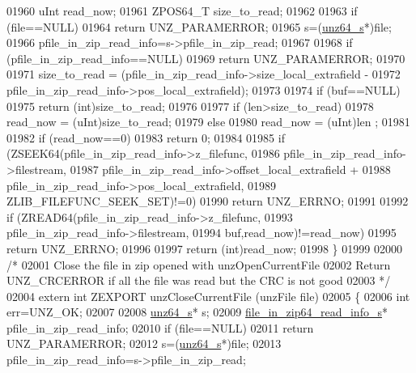 \begin{DoxyCode}
01960     uInt read\_now;
01961     ZPOS64\_T size\_to\_read;
01962 
01963     \textcolor{keywordflow}{if} (file==NULL)
01964         \textcolor{keywordflow}{return} UNZ\_PARAMERROR;
01965     s=(\hyperlink{structunz64__s}{unz64\_s}*)file;
01966     pfile\_in\_zip\_read\_info=s->pfile\_in\_zip\_read;
01967 
01968     \textcolor{keywordflow}{if} (pfile\_in\_zip\_read\_info==NULL)
01969         \textcolor{keywordflow}{return} UNZ\_PARAMERROR;
01970 
01971     size\_to\_read = (pfile\_in\_zip\_read\_info->size\_local\_extrafield -
01972                 pfile\_in\_zip\_read\_info->pos\_local\_extrafield);
01973 
01974     \textcolor{keywordflow}{if} (buf==NULL)
01975         \textcolor{keywordflow}{return} (\textcolor{keywordtype}{int})size\_to\_read;
01976 
01977     \textcolor{keywordflow}{if} (len>size\_to\_read)
01978         read\_now = (uInt)size\_to\_read;
01979     \textcolor{keywordflow}{else}
01980         read\_now = (uInt)len ;
01981 
01982     \textcolor{keywordflow}{if} (read\_now==0)
01983         \textcolor{keywordflow}{return} 0;
01984 
01985     \textcolor{keywordflow}{if} (ZSEEK64(pfile\_in\_zip\_read\_info->z\_filefunc,
01986               pfile\_in\_zip\_read\_info->filestream,
01987               pfile\_in\_zip\_read\_info->offset\_local\_extrafield +
01988               pfile\_in\_zip\_read\_info->pos\_local\_extrafield,
01989               ZLIB\_FILEFUNC\_SEEK\_SET)!=0)
01990         \textcolor{keywordflow}{return} UNZ\_ERRNO;
01991 
01992     \textcolor{keywordflow}{if} (ZREAD64(pfile\_in\_zip\_read\_info->z\_filefunc,
01993               pfile\_in\_zip\_read\_info->filestream,
01994               buf,read\_now)!=read\_now)
01995         \textcolor{keywordflow}{return} UNZ\_ERRNO;
01996 
01997     \textcolor{keywordflow}{return} (\textcolor{keywordtype}{int})read\_now;
01998 \}
01999 
02000 \textcolor{comment}{/*}
02001 \textcolor{comment}{  Close the file in zip opened with unzOpenCurrentFile}
02002 \textcolor{comment}{  Return UNZ\_CRCERROR if all the file was read but the CRC is not good}
02003 \textcolor{comment}{*/}
02004 \textcolor{keyword}{extern} \textcolor{keywordtype}{int} ZEXPORT unzCloseCurrentFile (unzFile file)
02005 \{
02006     \textcolor{keywordtype}{int} err=UNZ\_OK;
02007 
02008     \hyperlink{structunz64__s}{unz64\_s}* s;
02009     \hyperlink{structfile__in__zip64__read__info__s}{file\_in\_zip64\_read\_info\_s}* pfile\_in\_zip\_read\_info;
02010     \textcolor{keywordflow}{if} (file==NULL)
02011         \textcolor{keywordflow}{return} UNZ\_PARAMERROR;
02012     s=(\hyperlink{structunz64__s}{unz64\_s}*)file;
02013     pfile\_in\_zip\_read\_info=s->pfile\_in\_zip\_read;

\end{DoxyCode}
